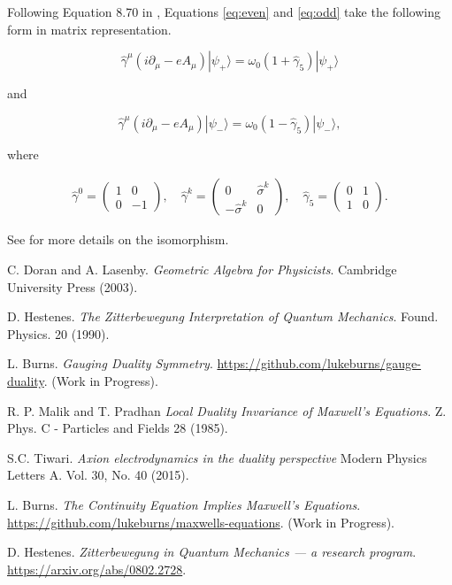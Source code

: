\documentclass[twocolumn]{article}
\begin{document}
  Following Equation 8.70 in \cite{gap}, Equations \ref{eq:even} and \ref{eq:odd} take the following form in matrix representation.

  \begin{equation}
    \hat \gamma^\mu (i \partial_\mu - e A_\mu) | \psi_+ \rangle = \omega_0 (1 + \hat \gamma_5) | \psi_+ \rangle
  \end{equation}

  and

  \begin{equation}
    \hat \gamma^\mu (i \partial_\mu - e A_\mu) | \psi_- \rangle = \omega_0 (1 - \hat \gamma_5) | \psi_- \rangle,
  \end{equation}

  where

  \begin{align}
    \hat \gamma^0 = \begin{pmatrix} 1 & 0 \\ 0 & -1 \end{pmatrix},\quad \hat \gamma^k = \begin{pmatrix} 0 & \hat \sigma^k \\ -\hat \sigma^k & 0 \end{pmatrix},\quad \hat \gamma_5 = \begin{pmatrix} 0 & 1 \\ 1 & 0 \end{pmatrix}.
  \end{align}

  See \cite{gap} for more details on the isomorphism.

  \begin{thebibliography}{9}
      C. Doran and A. Lasenby.
      \emph{Geometric Algebra for Physicists}. Cambridge University Press (2003).

      D. Hestenes.
      \emph{The Zitterbewegung Interpretation of Quantum Mechanics}.
      Found. Physics. 20 (1990).

      L. Burns.
      \emph{Gauging Duality Symmetry}.
      \url{https://github.com/lukeburns/gauge-duality}. (Work in Progress).

      R. P. Malik and T. Pradhan 
      \emph{Local Duality Invariance of Maxwell's Equations}.
      Z. Phys. C - Particles and Fields 28 (1985).

      S.C. Tiwari.
      \emph{Axion electrodynamics in the duality perspective}
      Modern Physics Letters A.
      Vol. 30, No. 40 (2015).

      L. Burns.
      \emph{The Continuity Equation Implies Maxwell's Equations}.
      \url{https://github.com/lukeburns/maxwells-equations}. (Work in Progress).

      D. Hestenes.
      \emph{Zitterbewegung in Quantum Mechanics --- a research program}.
      \url{https://arxiv.org/abs/0802.2728}.

  \end{thebibliography}
\end{document}
